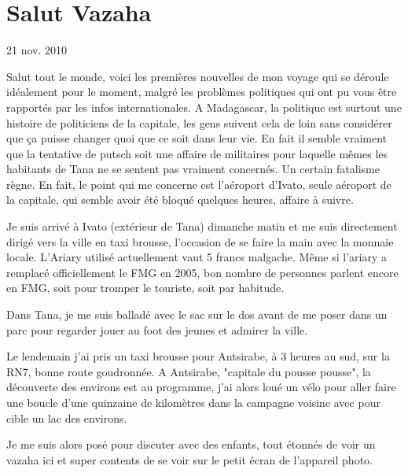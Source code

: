 \section{Salut Vazaha}

21 nov. 2010

\begin{multicols}{2}

Salut tout le monde, voici les premières nouvelles de mon voyage qui se déroule idéalement pour le moment, malgré les problèmes politiques qui ont pu vous être rapportés par les infos internationales. A Madagascar, la politique est surtout une histoire de politiciens de la capitale, les gens suivent cela de loin sans considérer que ça puisse changer quoi que ce soit dans leur vie. En fait il semble vraiment que la tentative de putsch soit une affaire de militaires pour laquelle mêmes les habitants de Tana ne se sentent pas vraiment concernés. Un certain fatalisme règne. En fait, le point qui me concerne est l'aéroport d'Ivato, seule aéroport de la capitale, qui semble avoir été bloqué quelques heures, affaire à suivre.

Je suis arrivé à Ivato (extérieur de Tana) dimanche matin et me suis directement dirigé vers la ville en taxi brousse, l'occasion de se faire la main avec la monnaie locale. L'Ariary utilisé actuellement vaut 5 francs malgache. Même si l'ariary a remplacé officiellement le FMG en 2005, bon nombre de personnes parlent encore en FMG, soit pour tromper le touriste, soit par habitude.

Dans Tana, je me suis balladé avec le sac sur le dos avant de me poser dans un parc pour regarder jouer au foot des jeunes et admirer la ville.


Le lendemain j'ai pris un taxi brousse pour Antsirabe, à 3 heures au sud, sur la RN7, bonne route goudronnée. A Antsirabe, "capitale du pousse pousse", la découverte des environs est au programme, j'ai alors loué un vélo pour aller faire une boucle d'une quinzaine de kilomètres dans la campagne voisine avec pour cible un lac des environs.


Je me suis alors posé pour discuter avec des enfants, tout étonnés de voir un vazaha ici et super contents de se voir sur le petit écran de l'appareil photo.


\end{multicols}
